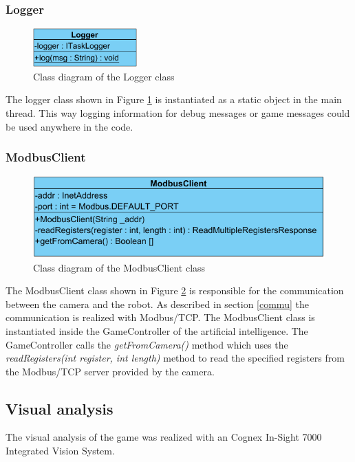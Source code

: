 \documentclass[a4paper]{spie}  %
\begin{document}
\begin{large}
\subsubsection{Logger}
\begin{figure}[h]
\includegraphics[width=4cm]{images/class_lo.png}
\centering
\caption{Class diagram of the Logger class}
\label{class_lo}
\end{figure}
The logger class shown in Figure \ref{class_lo} is instantiated as a static object in the main thread. This way logging information for debug messages or game messages could be used anywhere in the code.
\subsubsection{ModbusClient}
\begin{figure}[h]
\includegraphics[width=12cm]{images/class_moCli.png}
\centering
\caption{Class diagram of the ModbusClient class}
\label{class_moCli}
\end{figure}
The ModbusClient class shown in Figure \ref{class_moCli} is responsible for the communication between the camera and the robot. As described in section \ref{commu} the communication is realized with Modbus/TCP. The ModbusClient class is instantiated inside the GameController of the artificial intelligence. The GameController calls the \emph{getFromCamera()} method which uses the \emph{readRegisters(int register, int length)} method to read the specified registers from the Modbus/TCP server provided by the camera. 

\subsection{Visual analysis}
The visual analysis of the game was realized with an Cognex In-Sight 7000 Integrated Vision System. 

\end{large}
\end{document}

